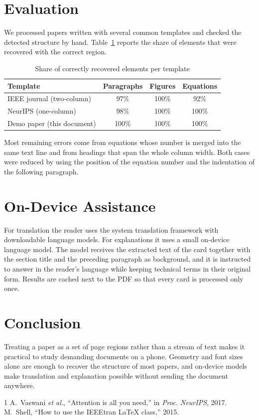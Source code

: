 \documentclass[journal]{IEEEtran}
\begin{document}
\section{Evaluation}
We processed papers written with several common templates and checked the detected structure by hand. Table~\ref{tab:results} reports the share of elements that were recovered with the correct region.

\begin{table}[t]
\centering
\caption{Share of correctly recovered elements per template}
\label{tab:results}
\begin{tabular}{lccc}
\toprule
Template & Paragraphs & Figures & Equations \\
\midrule
IEEE journal (two-column) & 97\% & 100\% & 92\% \\
NeurIPS (one-column) & 98\% & 100\% & 100\% \\
Demo paper (this document) & 100\% & 100\% & 100\% \\
\bottomrule
\end{tabular}
\end{table}

Most remaining errors come from equations whose number is merged into the same text line and from headings that span the whole column width. Both cases were reduced by using the position of the equation number and the indentation of the following paragraph.

\section{On-Device Assistance}
For translation the reader uses the system translation framework with downloadable language models. For explanations it uses a small on-device language model. The model receives the extracted text of the card together with the section title and the preceding paragraph as background, and it is instructed to answer in the reader's language while keeping technical terms in their original form. Results are cached next to the PDF so that every card is processed only once.

\section{Conclusion}
Treating a paper as a set of page regions rather than a stream of text makes it practical to study demanding documents on a phone. Geometry and font sizes alone are enough to recover the structure of most papers, and on-device models make translation and explanation possible without sending the document anywhere.

\begin{thebibliography}{1}
A.~Vaswani \emph{et al.}, ``Attention is all you need,'' in \emph{Proc. NeurIPS}, 2017.
M.~Shell, ``How to use the IEEEtran \LaTeX{} class,'' 2015.
\end{thebibliography}
\end{document}
